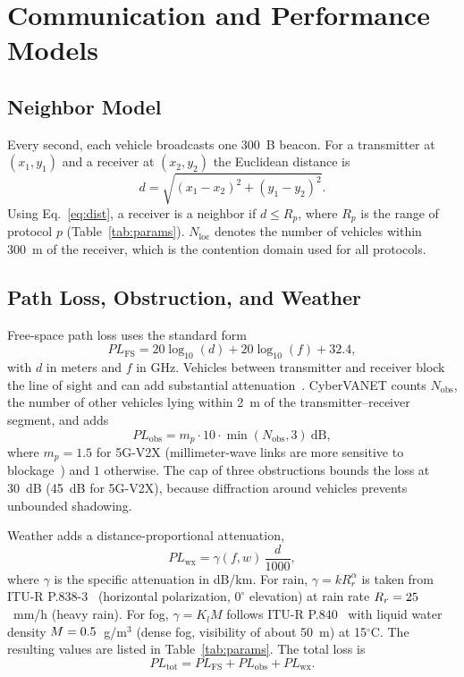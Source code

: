 \documentclass[conference]{IEEEtran}
\begin{document}
 
\section{Communication and Performance Models}
\label{sec:models}
\subsection{Neighbor Model}
Every second, each vehicle broadcasts one 300~B beacon. For a transmitter at $(x_1,y_1)$ and a receiver at $(x_2,y_2)$ the Euclidean distance is
\begin{equation}
d=\sqrt{(x_1-x_2)^2+(y_1-y_2)^2}.
\label{eq:dist}
\end{equation}
Using Eq.~\eqref{eq:dist}, a receiver is a neighbor if $d\le R_p$, where $R_p$ is the range of protocol $p$ (Table~\ref{tab:params}). $N_\mathrm{loc}$ denotes the number of vehicles within 300~m of the receiver, which is the contention domain used for all protocols.

\subsection{Path Loss, Obstruction, and Weather}
Free-space path loss uses the standard form~\cite{rappaport2002}
\begin{equation}
PL_\mathrm{FS}=20\log_{10}(d)+20\log_{10}(f)+32.4,
\label{eq:fspl}
\end{equation}
with $d$ in meters and $f$ in GHz. Vehicles between transmitter and receiver block the line of sight and can add substantial attenuation~\cite{boban2011}. CyberVANET counts $N_\mathrm{obs}$, the number of other vehicles lying within 2~m of the transmitter--receiver segment, and adds
\begin{equation}
PL_\mathrm{obs}=m_p\cdot 10\cdot\min(N_\mathrm{obs},3)\ \mathrm{dB},
\label{eq:obs}
\end{equation}
where $m_p=1.5$ for 5G-V2X (millimeter-wave links are more sensitive to blockage~\cite{molisch2024}) and $1$ otherwise. The cap of three obstructions bounds the loss at 30~dB (45~dB for 5G-V2X), because diffraction around vehicles prevents unbounded shadowing.

Weather adds a distance-proportional attenuation,
\begin{equation}
PL_\mathrm{wx}=\gamma(f,w)\,\frac{d}{1000},
\label{eq:wx}
\end{equation}
where $\gamma$ is the specific attenuation in dB/km. For rain, $\gamma=kR_r^{\alpha}$ is taken from ITU-R P.838-3~\cite{itu838} (horizontal polarization, $0^\circ$ elevation) at rain rate $R_r=25$~mm/h (heavy rain). For fog, $\gamma=K_l M$ follows ITU-R P.840~\cite{itu840} with liquid water density $M=0.5$~g/m$^3$ (dense fog, visibility of about 50~m) at 15$^\circ$C. The resulting values are listed in Table~\ref{tab:params}. The total loss is
\begin{equation}
PL_\mathrm{tot}=PL_\mathrm{FS}+PL_\mathrm{obs}+PL_\mathrm{wx}.
\label{eq:pltot}
\end{equation}
\end{document}
